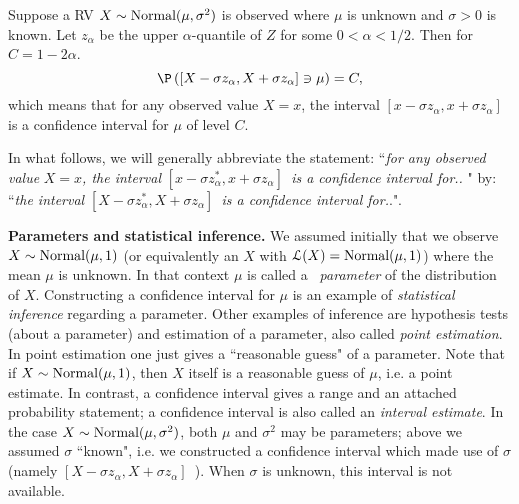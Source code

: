 \begin{prop}
\label{prop-normal-CI}Suppose a RV $X\sim \mbox{{\rm Normal}}(\mu ,\sigma ^{2})$ is observed
where $\mu $ is unknown and $\sigma >0$ is known. Let $z_{\alpha}$
be the upper $\alpha $-quantile of $Z$ for some $0<\alpha <1/2$. Then for $%
C=1-2\alpha $.%
\begin{equation*}
\P \left( \left[ X-\sigma z_{\alpha},X+\sigma z_{\alpha}%
\right] \ni \mu \right) =C,
\end{equation*}%
which means that for any observed value $X=x$, the interval $\left[ x-\sigma
z_{\alpha},x+\sigma z_{\alpha}\right] $ is a confidence
interval for $\mu $ of level $C$.
\end{prop}

In what follows, we will generally abbreviate the statement: ``\textit{for
any observed value }$X=x$\textit{, the interval }$\left[ x-\sigma z_{\alpha
}^{\ast },x+\sigma z_{\alpha}\right] $\textit{\ is a confidence
interval for.. }" by: ``\textit{the interval }$\left[ X-\sigma z_{\alpha
}^{\ast },X+\sigma z_{\alpha}\right] $\textit{\ is a confidence
interval for.}.".\bigskip

\textbf{Parameters and statistical inference.} We assumed initially that we
observe $X\sim \mbox{{\rm Normal}}(\mu ,1)$ (or equivalently an $X$ with $\mathcal{L}(X)=\mbox{{\rm Normal}}(\mu
,1)$) where the mean $\mu $ is unknown. In that context $\mu $ is called a%
\textit{\ parameter} of the distribution of $X$. Constructing a confidence
interval for $\mu $ is an example of \textit{statistical inference }%
regarding a parameter. Other examples of inference are hypothesis tests
(about a parameter) and estimation of a parameter, also called \textit{point
estimation}. In point estimation one just gives a ``reasonable guess" of a
parameter. Note that if $X\sim \mbox{{\rm Normal}}(\mu ,1)$, then $X$ itself is a reasonable
guess of $\mu $, i.e. a point estimate. In contrast, a confidence interval
gives a range and an attached probability statement; a confidence interval
is also called an \textit{interval estimate}. In the case $X\sim \mbox{{\rm Normal}}(\mu
,\sigma ^{2})$, both $\mu $ and $\sigma ^{2}$ may be parameters; above we
assumed $\sigma $ ``known", i.e. we constructed a confidence interval which
made use of $\sigma $ (namely $\left[ X-\sigma z_{\alpha},X+\sigma
z_{\alpha}\right] $\textit{\ }). When $\sigma $ is unknown, this
interval is not available. \bigskip

